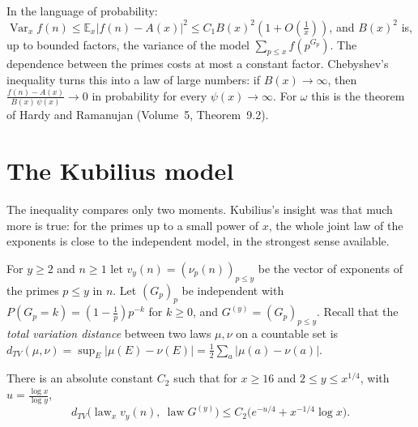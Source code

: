 In the language of probability: $\operatorname{Var}_xf(n)\le\mathbb E_x|f(n)-A(x)|^2\le C_1B(x)^2(1+O(\frac1x))$, and $B(x)^2$ is, up to bounded factors, the variance of the model $\sum_{p\le x}f(p^{G_p})$. The dependence between the primes costs at most a constant factor. Chebyshev's inequality turns this into a law of large numbers: if $B(x)\to\infty$, then $\frac{f(n)-A(x)}{B(x)\,\psi(x)}\to0$ in probability for every $\psi(x)\to\infty$. For $\omega$ this is the theorem of Hardy and Ramanujan (Volume~5, Theorem~9.2).

\section{The Kubilius model}

The inequality compares only two moments. Kubilius's insight was that much more is true: for the primes up to a small power of $x$, the whole joint law of the exponents is close to the independent model, in the strongest sense available.

For $y\ge2$ and $n\ge1$ let $v_y(n)=(\nu_p(n))_{p\le y}$ be the vector of exponents of the primes $p\le y$ in $n$. Let $(G_p)_p$ be independent with $P(G_p=k)=(1-\frac1p)p^{-k}$ for $k\ge0$, and $G^{(y)}=(G_p)_{p\le y}$. Recall that the \emph{total variation distance} between two laws $\mu,\nu$ on a countable set is $d_{TV}(\mu,\nu)=\sup_E|\mu(E)-\nu(E)|=\frac12\sum_a|\mu(a)-\nu(a)|$.

\begin{theorem}[Kubilius]\label{thm:kubilius}
There is an absolute constant $C_2$ such that for $x\ge16$ and $2\le y\le x^{1/4}$, with $u=\frac{\log x}{\log y}$,
\[
d_{TV}\bigl(\operatorname{law}_x v_y(n),\ \operatorname{law}G^{(y)}\bigr)\le C_2\bigl(e^{-u/4}+x^{-1/4}\log x\bigr).
\]
\end{theorem}

